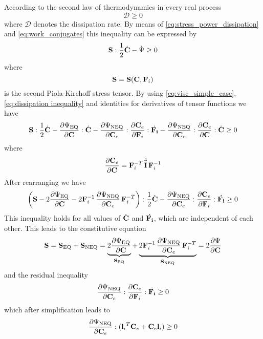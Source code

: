 According to the second law of thermodynamics in every real process 
\begin{equation}
    \mathcal{D} \geq 0
\end{equation}
where \(\mathcal{D}\) denotes the dissipation rate. By means of \cref{eq:stress_power_dissipation} and \cref{eq:work_conjugates} this inequality can be expressed by 
\begin{equation}
    \mathbf{S} : \frac{1}{2} \dot{\mathbf{C}} - \dot{\Psi} \geq 0
    \label{eq:dissipation inequality}
\end{equation}
where 
\begin{equation}
    \mathbf{S} = \mathbf{S}(\mathbf{C}, {\mathbf{F}_{i}})
\end{equation} is the second Piola-Kirchoff stress tensor. By using \cref{eq:visc_simple_case}, \cref{eq:dissipation inequality} and identities for derivatives of tensor functions \cite[refer Eq. 1.149][]{Itskov} we have
\begin{equation}
     \mathbf{S} : \frac{1}{2} \dot{\mathbf{C}} 
    - \pdv{\Psi_{\text{EQ}}}{\mathbf{C}} : \dot{\mathbf{C}}
    - \pdv{\Psi_{\text{NEQ}}}{\mathbf{C}_{e}} : \pdv{\mathbf{C}_{e}}{\mathbf{F}_{i}} : \dot{\mathbf{F}_{i}}
    - \pdv{\Psi_{\text{NEQ}}}{\mathbf{C}_{e}} : \pdv{\mathbf{C}_{e}}{\mathbf{C}} : \dot{\mathbf{C}} \geq 0
\end{equation}
where
\begin{equation}
    \pdv{\mathbf{C}_{e}}{\mathbf{C}}  = \mathbf{F}_{i}^{-T} \, \overset{4}{\mathbf{I}} \,\mathbf{F}_{i}^{-1}
\end{equation}
After rearranging we have
\begin{equation}
    \left( \mathbf{S}
    - 2\pdv{\Psi_{\text{EQ}}}{\mathbf{C}} 
    - 2 \mathbf{F}_{i}^{-1} \,\pdv{\Psi_{\text{NEQ}}}{\mathbf{C}_{e}} \,\mathbf{F}_{i}^{-T} \right) : \frac{1}{2}\dot{\mathbf{C}} 
    - \pdv{\Psi_{\text{NEQ}}}{\mathbf{C}_{e}}:\pdv{\mathbf{C}_{e}}{\mathbf{F}_{i}} : \dot{\mathbf{F}_{i}} \geq 0        
\end{equation}
This inequality holds for all values of \(\dot{\mathbf{C}}\) and \(\dot{\mathbf{F}_{i}}\), which are independent of each other. This leads to the constitutive equation 
\begin{equation}
    \mathbf{S} = \mathbf{S}_{\text{EQ}} + \mathbf{S}_{\text{NEQ}} 
    = \underbrace{2 \pdv{\Psi_{\text{EQ}}}{\mathbf{C}}}_{\mathbf{S}_{\text{EQ}}}
    + \underbrace{2 \mathbf{F}_{i}^{-1} \,\pdv{\Psi_{\text{NEQ}}}{\mathbf{C}_{e}} \,\mathbf{F}_{i}^{-T}}_{\mathbf{S}_{\text{NEQ}}}
    = 2 \pdv{\Psi}{\mathbf{C}}
    \label{eq:stress_split}
\end{equation}
and the residual inequality
\begin{equation}
    \pdv{\Psi_{\text{NEQ}}}{\mathbf{C}_{e}}:\pdv{\mathbf{C}_{e}}{\mathbf{F}_{i}} : \dot{\mathbf{F}_{i}} \geq 0          
\end{equation}
which after simplification leads to 
\begin{equation}
    \pdv{\Psi_{\text{NEQ}}}{\mathbf{C}_{e}}: ({\mathbf{l}_{i}}^{T} \mathbf{C}_{e} + \mathbf{C}_{e} \mathbf{l}_{i}) \geq 0          
\end{equation}
